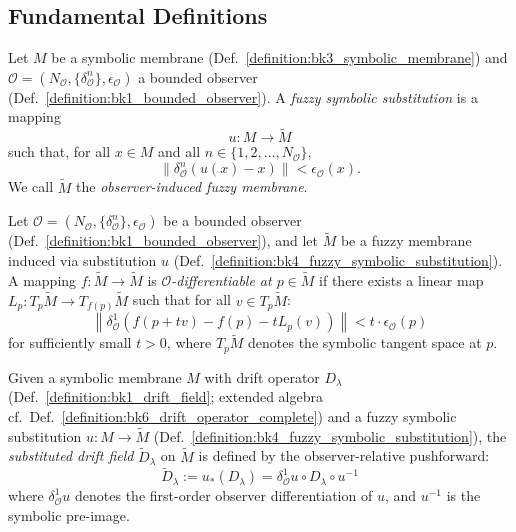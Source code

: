\subsection{Fundamental Definitions}
\begin{definition}
\label{definition:bk4_fuzzy_symbolic_substitution}
Let $M$ be a symbolic membrane (Def.~\ref{definition:bk3_symbolic_membrane}) and $\mathcal{O} = (N_\mathcal{O}, \{\delta^n_\mathcal{O}\}, \epsilon_\mathcal{O})$ a bounded observer (Def.~\ref{definition:bk1_bounded_observer}). A \emph{fuzzy symbolic substitution} is a mapping
\[
u : M \to \tilde{M}
\]
such that, for all $x \in M$ and all $n \in \{1,2,\ldots,N_\mathcal{O}\}$,
\[
\| \delta^n_\mathcal{O}(u(x) - x) \| < \epsilon_\mathcal{O}(x).
\]
We call $\tilde{M}$ the \emph{observer-induced fuzzy membrane}.
\end{definition}
\begin{definition}
\label{definition:bk4_observer_differentiable_}
Let $\mathcal{O} = (N_\mathcal{O}, \{\delta^n_\mathcal{O}\}, \epsilon_\mathcal{O})$ be a bounded observer (Def.~\ref{definition:bk1_bounded_observer}), and let $\tilde{M}$ be a fuzzy membrane induced via substitution $u$ (Def.~\ref{definition:bk4_fuzzy_symbolic_substitution}). A mapping $f: \tilde{M} \to \tilde{M}$ is \emph{$\mathcal{O}$-differentiable at $p \in \tilde{M}$} if there exists a linear map $L_p: T_p\tilde{M} \to T_{f(p)}\tilde{M}$ such that for all $v \in T_p\tilde{M}$:
\[
\left\|\delta^1_\mathcal{O}\left(f(p + tv) - f(p) - tL_p(v)\right)\right\| < t \cdot \epsilon_\mathcal{O}(p)
\]
for sufficiently small $t > 0$, where $T_p\tilde{M}$ denotes the symbolic tangent space at $p$.
\end{definition}
\begin{definition}
\label{definition:bk4_substituted_drift_field}
Given a symbolic membrane $M$ with drift operator $D_\lambda$ (Def.~\ref{definition:bk1_drift_field}; extended algebra cf.~Def.~\ref{definition:bk6_drift_operator_complete}) and a fuzzy symbolic substitution $u: M \to \tilde{M}$ (Def.~\ref{definition:bk4_fuzzy_symbolic_substitution}), the \emph{substituted drift field} $\tilde{D}_\lambda$ on $\tilde{M}$ is defined by the observer-relative pushforward:
\[
\tilde{D}_\lambda := u_*(D_\lambda) = \delta^1_\mathcal{O}u \circ D_\lambda \circ u^{-1}
\]
where $\delta^1_\mathcal{O}u$ denotes the first-order observer differentiation of $u$, and $u^{-1}$ is the symbolic pre-image.
\end{definition}

